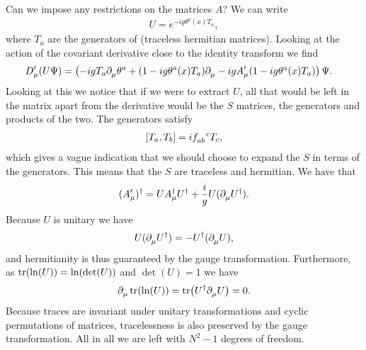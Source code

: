 Can we impose any restrictions on the matrices $A$? We can write
\begin{align*}
	U = e^{-ig\theta^{a}(x)T_{a}},
\end{align*}
where $T_{a}$ are the generators of  (traceless hermitian matrices). Looking at the action of the covariant derivative close to the identity transform we find
\begin{align*}
	D_{\mu}^{\prime}(U\Psi) &= \left(-igT_{a}\partial^{}_{\mu}\theta^{a} + (1 - ig\theta^{a}(x)T_{a})\partial^{}_{\mu} - igA_{\mu}^{\prime}(1 - ig\theta^{a}(x)T_{a})\right)\Psi.
\end{align*}
Looking at this we notice that if we were to extract $U$, all that would be left in the matrix apart from the derivative would be the $S$ matrices, the generators and products of the two. The generators satisfy
\begin{align*}
	\comm{T_{a}}{T_{b}} = i\srconst{ab}{c}T_{c},
\end{align*}
which gives a vague indication that we should choose to expand the $S$ in terms of the generators. This means that the $S$ are traceless and hermitian. We have that
\begin{align*}
	(A_{\mu}^{\prime})^{\dagger} = UA_{\mu}^{\dagger} U^{\dagger} + \frac{i}{g}U(\partial^{}_{\mu}U^{\dagger}).
\end{align*}
Because $U$ is unitary we have
\begin{align*}
	U(\partial^{}_{\mu}U^{\dagger}) = -U^{\dagger}(\partial^{}_{\mu}U),
\end{align*}
and hermitianity is thus guaranteed by the gauge transformation. Furthermore, as $\tr(\ln(U)) = \ln(\det(U))$ and $\det(U) = 1$ we have
\begin{align*}
	\partial^{}_{\mu}\tr(\ln(U)) = \tr(U^{\dagger}\partial^{}_{\mu}U) = 0.
\end{align*}
Because traces are invariant under unitary transformations and cyclic permutations of matrices, tracelessness is also preserved by the gauge transformation. All in all we are left with $N^{2} - 1$ degrees of freedom.

